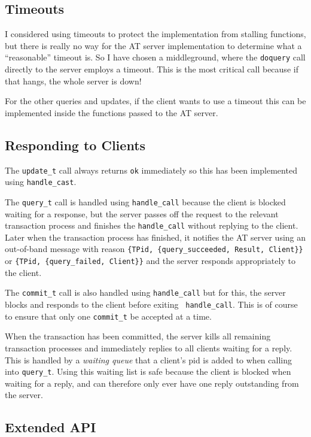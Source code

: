 \documentclass[
paper=a4,
oneside,
fontsize=11pt,
numbers=noenddot,
headinclude=false, %
footinclude=false, %
fleqn,             %
DIV=8
]{scrartcl}
\begin{document}
\subsection{Timeouts}

I considered using timeouts to protect the implementation from stalling
functions, but there is really no way for the AT server implementation to
determine what a ``reasonable'' timeout is. So I have chosen a middleground,
where the {\tt doquery} call directly to the server employs a timeout. This is
the most critical call because if that hangs, the whole server is down!

For the other queries and updates, if the client wants to use a timeout this
can be implemented inside the functions passed to the AT server.

\subsection{Responding to Clients}
\label{sec:responding-clients}

The {\tt update\_t} call always returns {\tt ok} immediately so this has been
implemented using {\tt handle\_cast}.

The {\tt query\_t} call is handled using {\tt handle\_call} because the client is
blocked waiting for a response, but the server passes off the request to the
relevant transaction process and finishes the {\tt handle\_call} without replying
to the client. Later when the transaction process has finished, it notifies the
AT server using an out-of-band message with reason {\tt \{TPid,
  \{query\_succeeded, Result, Client\}\}} or {\tt \{TPid, \{query\_failed,
  Client\}\}} and the server responds appropriately to the client.

The {\tt commit\_t} call is also handled using {\tt handle\_call} but for this,
the server blocks and responds to the client before exiting {\tt
  handle\_call}. This is of course to ensure that only one {\tt commit\_t} be
accepted at a time.

When the transaction has been committed, the server kills all remaining
transaction processes and immediately replies to all clients waiting for a
reply. This is handled by a {\em waiting queue} that a client's pid is added to
when calling into {\tt query\_t}. Using this waiting list is safe because the
client is blocked when waiting for a reply, and can therefore only ever have one
reply outstanding from the server.

\subsection{Extended API}
\label{sec:extended-api}
\end{document}
